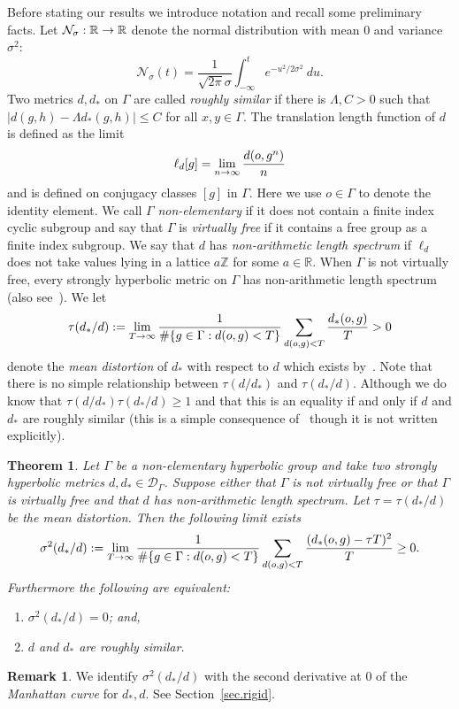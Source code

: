 \documentclass[10pt]{amsart}
\theoremstyle{definition}\newtheorem{defi}[theo]{Definition}\newtheorem{rema}[theo]{Remark}\newtheorem{exam}[theo]{Example}\newtheorem{exem}[theo]{Example}\newtheorem{nota}[theo]{Notation}
\newcommand{\G}{\Gamma}
\newcommand{\Dc}{\mathcal{D}}
\newcommand{\Nc}{\mathcal{N}}
\newcommand{\R}{\mathbb{R}}
\newcommand{\Z}{\mathbb{Z}}
\let\originalleft\left
\let\originalright\right
\renewcommand{\left}{\mathopen{}\mathclose\bgroup\originalleft}
\renewcommand{\right}{\aftergroup\egroup\originalright}
\renewcommand*{\to}{\mathchoice{\longrightarrow}{\rightarrow}{\rightarrow}{\rightarrow}}
\theoremstyle{plain}
\newtheorem{theol}{Theorem}
\begin{document}
Before stating our results we introduce notation and recall some preliminary facts. Let $\Nc_\sigma : \R \to \R$ denote the normal distribution with mean $0$ and variance $\sigma^2$:
\[
\Nc_\sigma(t) = \frac{1}{\sqrt{2\pi}\sigma} \int_{-\infty}^t e^{-u^2/2\sigma^2} \ du.
\]
Two metrics $d,d_\ast$ on $\G$ are called \emph{roughly similar} if there is $\Lambda, C >0$ such that $|d(g,h) - \Lambda d_\ast(g,h)| \le C$ for all $x,y \in \G$. The translation length function of $d$ is defined as the limit
\[
\ell_d[g] = \lim_{n\to\infty} \frac{d(o,g^n)}{n}
\]
and is defined on conjugacy classes $[g]$ in $\G$. Here we use $o\in\G$ to denote the identity element. We call $\G$ \emph{non-elementary} if it does not contain a finite index cyclic subgroup and say that $\G$ is \emph{virtually free} if it contains a free group as a finite index subgroup. We say that $d$ has \emph{non-arithmetic length spectrum} if $\ell_d$ does not take values lying in a lattice $a \Z$ for some $a \in\R$. When $\G$ is not virtually free, every strongly hyperbolic metric on $\G$ has non-arithmetic length spectrum~\cite{GMM2018} (also see~\cite[Theorem~1.4]{cantrell}). We let
\[
\tau(d_\ast/d) := \lim_{T\to\infty} \frac{1}{\#\left\{g\in\G: d(o,g) <T\right\}} \sum_{d(o,g) < T} \frac{d_\ast(o,g)}{T} > 0
\]
denote the \emph{mean distortion} of $d_\ast$ with respect to $d$ which exists by~\cite[Theorem~1]{cantrell.tanaka.1}. Note that there is no simple relationship between $\tau(d/d_\ast)$ and $\tau(d_\ast/d)$. Although we do know that $\tau(d/d_\ast) \tau(d_\ast/d) \ge 1$ and that this is an equality if and only if $d$ and $d_\ast$ are roughly similar (this is a simple consequence of~\cite[Theorem~1.1 and Theorem~1.2]{cantrell} though it is not written explicitly).

\begin{theol}\label{thm.var}
Let $\G$ be a non-elementary hyperbolic group and take two strongly hyperbolic metrics $d,d_\ast \in \Dc_\G$. Suppose either that $\G$ is not virtually free or that $\G$ is virtually free and that $d$ has non-arithmetic length spectrum. Let $\tau = \tau(d_\ast/d)$ be the mean distortion. Then the following limit exists
\[
\sigma^2(d_\ast/d) := \lim_{T\to\infty} \frac{1}{\#\left\{g \in \G: d(o,g) < T\right\}} \sum_{d(o,g) < T} \frac{(d_\ast(o,g) - \tau T)^2}{T} \ge 0.
\]
Furthermore the following are equivalent:
\begin{enumerate}
\item\label{theo1.1.1} $\sigma^2(d_\ast/d) = 0$; and,
\item\label{theo1.1.2} $d$ and $d_\ast$ are roughly similar.
\end{enumerate}
\end{theol}
\begin{rema}
We identify $\sigma^2(d_\ast/d)$ with the second derivative at $0$ of the \emph{Manhattan curve} for $d_\ast, d$. See Section~\ref{sec.rigid}.
\end{rema}
\end{document}
